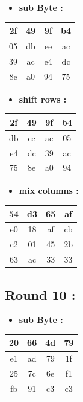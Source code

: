 \documentclass{article}
\begin{document}
\begin{itemize}
    \item \textbf{sub Byte :}
\end{itemize} \begin{tabular}{|c|c|c|c|}
\hline 2f & 49 & 9f & b4 \\ \hline 05 & db & ee & ac \\ \hline 39 & ac & e4 & dc \\ \hline 8e & a0 & 94 & 75 \\ \hline \end{tabular}\hspace{0.5cm}\vspace{0.1cm}\begin{itemize}
    \item \textbf{shift rows :}
\end{itemize} \begin{tabular}{|c|c|c|c|}
\hline 2f & 49 & 9f & b4 \\ \hline db & ee & ac & 05 \\ \hline e4 & dc & 39 & ac \\ \hline 75 & 8e & a0 & 94 \\ \hline \end{tabular}\hspace{0.5cm}\vspace{0.1cm}\begin{itemize}
    \item \textbf{mix columns :}
\end{itemize} \begin{tabular}{|c|c|c|c|}
\hline 54 & d3 & 65 & af \\ \hline e0 & 18 & af & cb \\ \hline c2 & 01 & 45 & 2b \\ \hline 63 & ac & 33 & 33 \\ \hline \end{tabular}\hspace{0.5cm}\vspace{0.1cm}\subsection*{Round 10 : }\begin{itemize}
    \item \textbf{sub Byte :}
\end{itemize} \begin{tabular}{|c|c|c|c|}
\hline 20 & 66 & 4d & 79 \\ \hline e1 & ad & 79 & 1f \\ \hline 25 & 7c & 6e & f1 \\ \hline fb & 91 & c3 & c3 \\ \hline \end{tabular}\hspace{0.5cm}\vspace{0.1cm}\begin{itemize}

\end{itemize}
\end{document}
